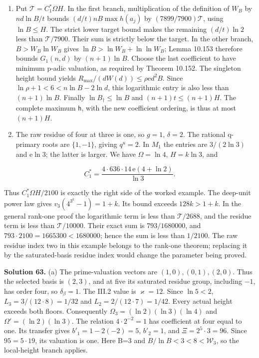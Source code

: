 \documentclass[
  11pt,
  a4paper,
]{article}
\begin{document}
\begin{enumerate}
\def\labelenumi{(\alph{enumi})}
\setcounter{enumi}{1}
\item
  Put \(\mathcal T=C_1^*\Omega H\). In the first branch, multiplication
  of the definition of \(W_B\) by \(nd\ln B/t\) bounds
  \((d/t)nB\max h(a_j)\) by \((7899/7900)\mathcal T\), using
  \(\ln B\le H\). The strict lower target bound makes the remaining
  \((d/t)\ln2\) less than \(\mathcal T/7900\). Their sum is strictly
  below the target. In the other branch, \(B>W_B\ln W_B\) gives
  \(\ln B>\ln W_B+\ln\ln W_B\); Lemma 10.153 therefore bounds
  \(G_1(n,d)\) by \((n+1)\ln B\). Choose the last coefficient to have
  minimum p-adic valuation, as required by Theorem 10.152. The singleton
  height bound yields \(R_{\max}/(dW(d))\le\rho\mathrm e d^2B\). Since
  \(\ln\rho+1<6<n\ln B-2\ln d\), this logarithmic entry is also less
  than \((n+1)\ln B\). Finally \(\ln B_\dagger\le\ln B\) and
  \((n+1)t\le(n+1)H\). The complete maximum \(\mathsf h\), with the new
  coefficient ordering, is thus at most \((n+1)H\).
\item
  The raw residue of four at three is one, so \(g=1\), \(\delta=2\). The
  rational q-primary roots are \(\{1,-1\}\), giving \(q^u=2\). In
  \(M_1\) the entries are \(3/(2\ln3)\) and \(\mathrm e\ln3\); the
  latter is larger. We have \(\Omega=\ln4\), \(H=k\ln3\), and
\end{enumerate}

\[
C_1^*=\frac{4\cdot636\cdot14\,\mathrm e(4+\ln2)}{\ln3}.
\]

Thus \(C_1^*\Omega H/2100\) is exactly the right side of the worked
example. The deep-unit power law gives \(v_3(4^{3^k}-1)=1+k\). Its bound
exceeds \(128k>1+k\). In the general rank-one proof the logarithmic term
is less than \(\mathcal T/2688\), and the residue term is less than
\(\mathcal T/10000\). Their exact sum is \(793/1680000\), and
\(793\cdot2100=1665300<1680000\); hence the sum is less than \(1/2100\).
The raw residue index two in this example belongs to the rank-one
theorem; replacing it by the saturated-basis residue index would change
the parameter being proved.

\textbf{Solution 63.} (a) The prime-valuation vectors are
\((1,0),(0,1),(2,0)\). Thus the selected basis is \((2,3)\), and at five
its saturated residue group, including \(-1\), has order four, so
\(\delta_\beta=1\). The III.2 value is \(\varkappa=12\). Since
\(\ln5<2\), \(L_3=3/(12\cdot8)=1/32\) and \(L_2=2/(12\cdot7)=1/42\).
Every actual height exceeds both floors. Consequently
\(\Omega_3=(\ln2)(\ln3)(\ln4)\) and \(\Omega'=(\ln2)(\ln3)\). The
relation \(4\cdot2^{-2}=1\) has coefficient at four equal to one. Its
transfer gives \(b'_1=1-2(-2)=5\), \(b'_2=1\), and \(\Xi=2^5\cdot3=96\).
Since \(95=5\cdot19\), its valuation is one. Here B=3 and
\(B/\ln B<3<8<\mathcal W_3\), so the local-height branch applies.
\end{document}
